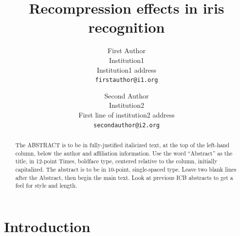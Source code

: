 \documentclass[10pt,twocolumn,letterpaper]{article}
\begin{document}
\title{Recompression effects in iris recognition}

\author{First Author\\
Institution1\\
Institution1 address\\
{\tt\small firstauthor@i1.org}
\and
Second Author\\
Institution2\\
First line of institution2 address\\
{\tt\small secondauthor@i2.org}
}






\maketitle
\thispagestyle{empty}

\begin{abstract}
   The ABSTRACT is to be in fully-justified italicized text, at the top
   of the left-hand column, below the author and affiliation
   information. Use the word ``Abstract'' as the title, in 12-point
   Times, boldface type, centered relative to the column, initially
   capitalized. The abstract is to be in 10-point, single-spaced type.
   Leave two blank lines after the Abstract, then begin the main text.
   Look at previous ICB abstracts to get a feel for style and length. 
\end{abstract}

\section{Introduction}
\end{document}
